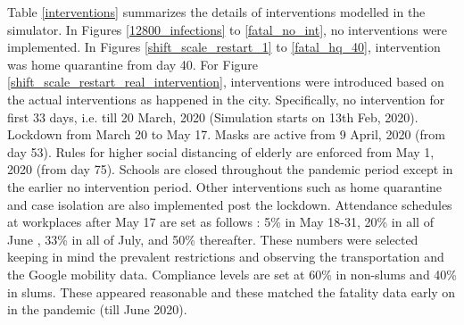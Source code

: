 \documentclass{article}
\theoremstyle{definition}
\begin{document}
   Table \ref{interventions} summarizes the details of interventions modelled in the simulator.
   In Figures \ref{12800_infections} to \ref{fatal_no_int}, no interventions were implemented. In Figures \ref{shift_scale_restart_1} to \ref{fatal_hq_40}, intervention was home quarantine from day 40. For Figure \ref{shift_scale_restart_real_intervention}, 
   interventions were introduced based on the actual interventions as happened in the city. Specifically,
   no intervention for first 33 days, i.e. till 20 March, 2020 (Simulation starts on 13th Feb, 2020). Lockdown from March 20 to May 17. Masks are active from 9 April, 2020 (from day 53). Rules for higher social distancing of elderly are enforced from May 1, 2020 (from day 75). 
   Schools are closed throughout the pandemic period except in the earlier no intervention period. 
   Other interventions such as home quarantine and  case isolation are also implemented post the lockdown. 
   Attendance schedules at workplaces after May 17 are set as follows : 5\% in May 18-31, 20\% in all of June , 33\% in all of July, and 50\% thereafter. 
   These numbers were selected keeping in mind the prevalent restrictions and observing the transportation and the Google mobility data. 
   Compliance levels are set at 60\% in non-slums and 40\% in slums. These appeared reasonable and these  matched the fatality data early on in the pandemic (till June 2020).
   
\end{document}
